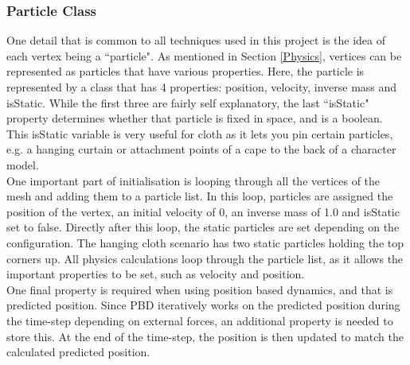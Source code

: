 \documentclass[12pt,a4paper]{article}
\begin{document}
\subsubsection{Particle Class}
One detail that is common to all techniques used in this project is the idea of each vertex being a ``particle". As mentioned in Section \ref{Physics}, vertices can be represented as particles that have various properties. Here, the particle is represented by a class that has 4 properties: position, velocity, inverse mass and isStatic. While the first three are fairly self explanatory, the last ``isStatic" property determines whether that particle is fixed in space, and is a boolean. This isStatic variable is very useful for cloth as it lets you pin certain particles, e.g. a hanging curtain or attachment points of a cape to the back of a character model. \\

One important part of initialisation is looping through all the vertices of the mesh and adding them to a particle list. In this loop, particles are assigned the position of the vertex, an initial velocity of 0, an inverse mass of 1.0 and isStatic set to false. Directly after this loop, the static particles are set depending on the configuration. The hanging cloth scenario has two static particles holding the top corners up. All physics calculations loop through the particle list, as it allows the important properties to be set, such as velocity and position.
\\

One final property is required when using position based dynamics, and that is predicted position. Since PBD iteratively works on the predicted position during the time-step depending on external forces, an additional property is needed to store this. At the end of the time-step, the position is then updated to match the calculated predicted position.
\end{document}
